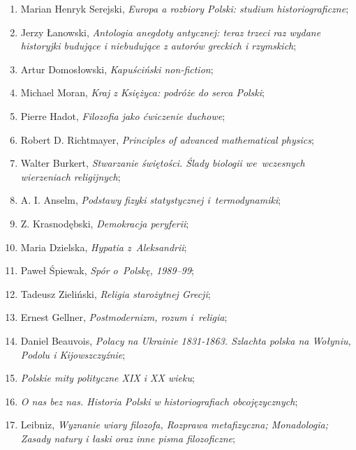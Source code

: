 \documentclass[a4paper,11pt]{article}
\begin{document}
\begin{enumerate}
\item Marian Henryk Serejski, \textit{Europa a rozbiory Polski: studium
    historiograficzne};

\item Jerzy Łanowski, \textit{Antologia anegdoty antycznej: teraz trzeci
    raz wydane historyjki budujące i niebudujące z autorów greckich i
    rzymskich};

\item Artur Domosłowski, \textit{Kapuściński non-fiction};

\item Michael Moran, \textit{Kraj z Księżyca: podróże do serca Polski};

\item Pierre Hadot, \textit{Filozofia jako ćwiczenie duchowe};

\item Robert D. Richtmayer, \textit{Principles of advanced mathematical
    physics};

\item Walter Burkert, \textit{Stwarzanie świętości. Ślady biologii
    we~wczesnych wierzeniach religijnych};

\item A. I. Anselm, \textit{Podstawy fizyki statystycznej
    i~termodynamiki};

\item Z. Krasnodębski, \textit{Demokracja peryferii};

\item Maria Dzielska, \textit{Hypatia z~Aleksandrii};

\item Paweł Śpiewak, \textit{Spór o~Polskę, 1989--99};

\item Tadeusz Zieliński, \textit{Religia starożytnej Grecji};

\item Ernest Gellner, \textit{Postmodernizm, rozum i~religia};

\item Daniel Beauvois, \textit{Polacy na Ukrainie 1831-1863. Szlachta
    polska na Wołyniu, Podolu i Kijowszczyźnie};

\item \textit{Polskie mity polityczne XIX i XX wieku};

\item \textit{O nas bez nas. Historia Polski w historiografiach
    obcojęzycznych};

\item Leibniz, \textit{Wyznanie wiary filozofa, Rozprawa metafizyczna;
    Monadologia; Zasady natury i łaski oraz inne pisma filozoficzne};


\end{enumerate}
\end{document}
